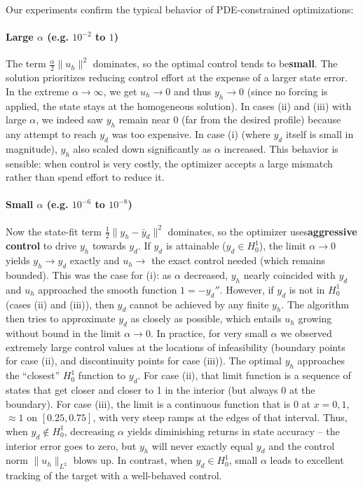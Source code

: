 \documentclass[a4paper,10pt]{article}
\begin{document}
Our experiments confirm the typical behavior of PDE-constrained optimizations:

\paragraph{Large \(\alpha\) (e.g. \(10^{-2}\) to \(1\))}
The term \(\frac{\alpha}{2}\|u_h\|^2\) dominates, so the optimal control tends to be\textbf{small}. The solution prioritizes reducing control effort at the expense of a larger state error. In the extreme \(\alpha\to\infty\), we get \(u_h\to 0\) and thus \(y_h\to 0\) (since no forcing is applied, the state stays at the homogeneous solution). In cases (ii) and (iii) with large \(\alpha\), we indeed saw \(y_h\) remain near 0 (far from the desired profile) because any attempt to reach \(y_d\) was too expensive. In case (i) (where \(y_d\) itself is small in magnitude), \(y_h\) also scaled down significantly as \(\alpha\) increased. This behavior is sensible: when control is very costly, the optimizer accepts a large mismatch rather than spend effort to reduce it.
\paragraph{Small \(\alpha\) (e.g. \(10^{-6}\) to \(10^{-8}\))}
Now the state-fit term \(\frac{1}{2}\|y_h-\bar y_d\|^2\) dominates, so the optimizer uses\textbf{aggressive control} to drive \(y_h\) towards \(y_d\). If \(y_d\) is attainable (\(y_d\in H^1_0\)), the limit \(\alpha\to 0\) yields \(y_h \to y_d\) exactly and \(u_h \to\) the exact control needed (which remains bounded). This was the case for (i): as \(\alpha\) decreased, \(y_h\) nearly coincided with \(y_d\) and \(u_h\) approached the smooth function \(1 = -y_d''\). However, if \(y_d\) is not in \(H^1_0\) (cases (ii) and (iii)), then \(y_d\) cannot be achieved by any finite \(y_h\). The algorithm then tries to approximate \(y_d\) as closely as possible, which entails \(u_h\) growing without bound in the limit \(\alpha\to 0\). In practice, for very small \(\alpha\) we observed extremely large control values at the locations of infeasibility (boundary points for case (ii), and discontinuity points for case (iii)). The optimal \(y_h\) approaches the “closest” \(H^1_0\) function to \(y_d\). For case (ii), that limit function is a sequence of states that get closer and closer to 1 in the interior (but always 0 at the boundary). For case (iii), the limit is a continuous function that is 0 at \(x=0,1\), \(\approx 1\) on \([0.25,0.75]\), with very steep ramps at the edges of that interval. Thus, when \(y_d \notin H^1_0\), decreasing \(\alpha\) yields diminishing returns in state accuracy – the interior error goes to zero, but \(y_h\) will never exactly equal \(y_d\) and the control norm \(\|u_h\|_{L^2}\) blows up. In contrast, when \(y_d\in H^1_0\), small \(\alpha\) leads to excellent tracking of the target with a well-behaved control.
\end{document}
